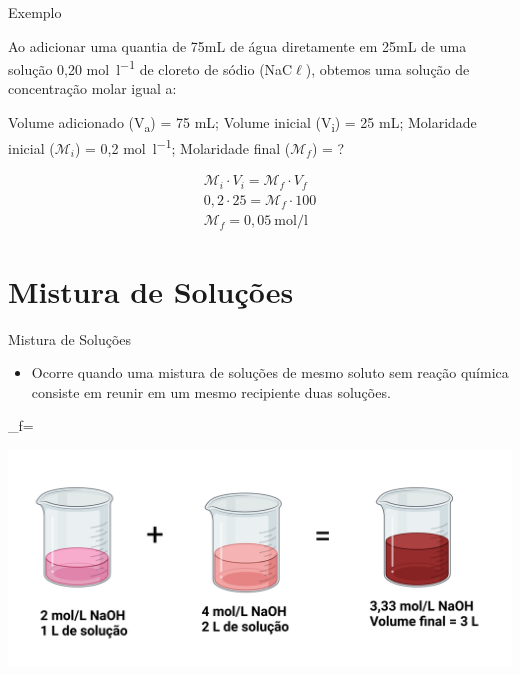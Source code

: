 \documentclass[presentation,professionalfonts,aspectratio=169]{beamer}
\begin{document}
\begin{frame}[label={sec:orgb9be7e2}]{Exemplo}
\begin{question}
Ao adicionar uma quantia de 75mL de água diretamente em 25mL de uma solução 0,20 \unit{\mol\per\litre} de cloreto de sódio (NaC\(\ell\)), obtemos uma solução de concentração molar igual a:
\end{question}

\begin{answer}[print=true]
Volume adicionado (V\textsubscript{a}) = 75 mL;  Volume inicial (V\textsubscript{i}) = 25 mL; Molaridade inicial (\(\mathcal{M}_i\)) = 0,2 \unit{\mol\per\litre}; Molaridade final (\(\mathcal{M}_f\)) = ?

\begin{align*}
\mathcal{M}_i \cdot V_i = \mathcal{M}_f \cdot V_f \\
0,2 \cdot 25 = \mathcal{M}_f \cdot 100\\
\mathcal{M}_f= 0,05~\unit{\mol\per\litre}
\end{align*}
\end{answer}
\end{frame}

\section{Mistura de Soluções}
\label{sec:org8646531}


\begin{frame}[label={sec:orgfc269cc}]{Mistura de Soluções}
\begin{itemize}
\item Ocorre quando uma mistura de soluções de mesmo soluto sem reação química consiste em reunir em um mesmo recipiente duas soluções.
\end{itemize}

\begin{tcolorbox}
_f= 
\end{tcolorbox}


\begin{center}
\includegraphics[scale=.3]{FQ/Solucoes/Mistura_Solucao.png}
\end{center}
\end{frame}
\end{document}
